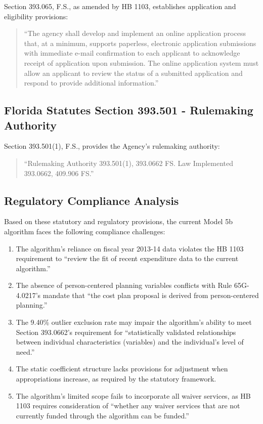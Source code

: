 Section 393.065, F.S., as amended by HB 1103, establishes application and eligibility provisions:

\begin{quote}
``The agency shall develop and implement an online application process that, at a minimum, supports paperless, electronic application submissions with immediate e-mail confirmation to each applicant to acknowledge receipt of application upon submission. The online application system must allow an applicant to review the status of a submitted application and respond to provide additional information.''
\end{quote}

\subsection{Florida Statutes Section 393.501 - Rulemaking Authority}

Section 393.501(1), F.S., provides the Agency's rulemaking authority:

\begin{quote}
``Rulemaking Authority 393.501(1), 393.0662 FS. Law Implemented 393.0662, 409.906 FS.''
\end{quote}

\subsection{Regulatory Compliance Analysis}

Based on these statutory and regulatory provisions, the current Model 5b algorithm faces the following compliance challenges:

\begin{enumerate}
    \item The algorithm's reliance on fiscal year 2013-14 data violates the HB 1103 requirement to ``review the fit of recent expenditure data to the current algorithm.''
    
    \item The absence of person-centered planning variables conflicts with Rule 65G-4.0217's mandate that ``the cost plan proposal is derived from person-centered planning.''
    
    \item The 9.40\% outlier exclusion rate may impair the algorithm's ability to meet Section 393.0662's requirement for ``statistically validated relationships between individual characteristics (variables) and the individual's level of need.''
    
    \item The static coefficient structure lacks provisions for adjustment when appropriations increase, as required by the statutory framework.
    
    \item The algorithm's limited scope fails to incorporate all waiver services, as HB 1103 requires consideration of ``whether any waiver services that are not currently funded through the algorithm can be funded.''
\end{enumerate}

